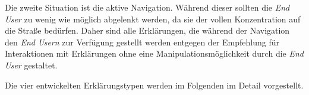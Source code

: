 Die zweite Situation ist die aktive Navigation. Während dieser sollten die \textit{End User} zu wenig wie möglich abgelenkt werden, da sie der vollen Konzentration auf die Straße bedürfen. Daher sind alle Erklärungen, die während der Navigation den \textit{End Usern} zur Verfügung gestellt werden entgegen der Empfehlung für Interaktionen mit Erklärungen ohne eine Manipulationsmöglichkeit durch die \textit{End User} gestaltet.

Die vier entwickelten Erklärungstypen werden im Folgenden im Detail vorgestellt.








